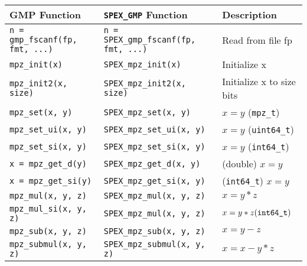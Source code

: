 \documentclass[12pt,oneside]{book}
\theoremstyle{definition}
\newenvironment{SizedCenteredTabular}[2][\small]
    {   
        #1\begin{center}\begin{tabular}{#2}
    }{ 
        \end{tabular}\end{center}
    }
\begin{document}
\begin{SizedCenteredTabular}[\scriptsize]{|l|l|l|} \hline
{\bf GMP Function} & \verb|SPEX_GMP| {\bf Function} & {\bf Description} \\ \hline\hline
\verb|n = gmp_fscanf(fp, fmt, ...)|
    & \verb|n = SPEX_gmp_fscanf(fp, fmt, ...)|
    & Read from file fp \\ \hline
\verb|mpz_init(x)|
    & \verb|SPEX_mpz_init(x)|
    & Initialize x \\ \hline
\verb|mpz_init2(x, size)|
    & \verb|SPEX_mpz_init2(x, size)|
    & Initialize x to size bits \\ \hline
\verb|mpz_set(x, y)|
    & \verb|SPEX_mpz_set(x, y)| 
    & $x = y$ (\verb|mpz_t|) \\ \hline
\verb|mpz_set_ui(x, y)|
    & \verb|SPEX_mpz_set_ui(x, y)|
    & $x = y$ (\verb|uint64_t|) \\ \hline
\verb|mpz_set_si(x, y)|
    & \verb|SPEX_mpz_set_si(x, y)|
    & $x = y$ (\verb|int64_t|) \\ \hline
\verb|x = mpz_get_d(y)|
    & \verb|SPEX_mpz_get_d(x, y)|
    &  (double) $x = y$\\ \hline
\verb|x = mpz_get_si(y)|
    & \verb|SPEX_mpz_get_si(x, y)|
    & (\verb|int64_t|) $x = y$ \\ \hline
\verb|mpz_mul(x, y, z)|
    & \verb|SPEX_mpz_mul(x, y, z)|
    & $x = y*z$ \\ \hline
\verb|mpz_mul_si(x, y, z)|
    & \verb|SPEX_mpz_mul(x, y, z)|
    & $x = y*z (\verb|int64_t|)$ \\ \hline
\verb|mpz_sub(x, y, z)|
    & \verb|SPEX_mpz_sub(x, y, z)|
    & $x = y-z$ \\ \hline
\verb|mpz_submul(x, y, z)|
    & \verb|SPEX_mpz_submul(x, y, z)|
    & $x = x-y*z$ \\ \hline

\end{SizedCenteredTabular}
\end{document}
